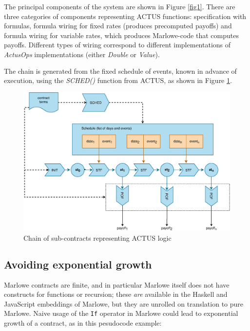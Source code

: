 \documentclass[runningheads]{llncs}
\newcommand{\ident}[1]{\mbox{\emph{#1}}}
\begin{document}
The principal components of the system are shown in Figure \ref{fig1}. There are three categories of components representing ACTUS functions: specification with formulas, formula wiring for fixed rates (produces precomputed payoffs) and formula wiring for variable rates, which  produces Marlowe-code that computes payoffs. Different types of wiring correspond to different implementations of \emph{ActusOps} implementations (either \emph{Double} or \emph{Value}). 

The chain
is generated from the fixed schedule of events, known in advance of execution, 
using the \ident{SCHED()} function from ACTUS, as shown in Figure \ref{fig2}.

\begin{figure}
\includegraphics[width=1\textwidth]{images/flowchart} \caption{Chain of sub-contracts representing ACTUS logic}
\label{fig2} 
\end{figure}


\subsection{Avoiding exponential growth }

Marlowe contracts are finite, and in particular Marlowe itself does not have constructs for functions or recursion; these \emph{are} available in the Haskell and JavaScript embeddings of Marlowe, but they are unrolled on translation to pure Marlowe. Naive usage of the \texttt{If} operator in Marlowe could lead to exponential growth of a contract, as in this pesudocode example:
\end{document}
